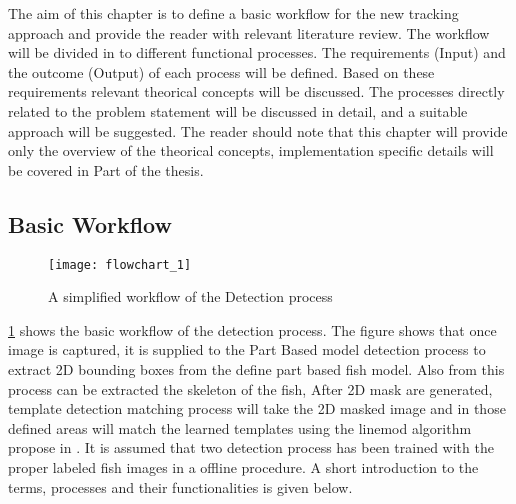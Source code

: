 The aim of this chapter is to define a basic workflow for the new tracking approach
and provide the reader with relevant literature review. The workflow will be divided
in to different functional processes. The requirements (Input) and the outcome (Output)
of each process will be defined. Based on these requirements relevant theorical concepts
will be discussed. The processes directly related to the problem statement will be 
discussed in detail, and a suitable approach will be suggested. The reader should
note that this chapter will provide only the overview of the theorical concepts, 
implementation specific details will be covered in Part  of the thesis.

\subsection{Basic Workflow}

\begin{figure}[ht]
\centering
\texttt{[image: flowchart\_1]}
\caption{A simplified workflow of the Detection process}
\label{fig:basicworkflow}
\end{figure}

\ref{fig:basicworkflow} shows the basic workflow of the detection process. The figure 
shows that once image is captured, it is supplied to the Part Based model detection 
process to extract 2D bounding boxes from the define part based fish model. Also from
this process can be extracted the skeleton of the fish, After 2D mask are generated, 
template detection matching process will take the 2D masked image and in those defined
areas will match the learned templates using the linemod algorithm propose in \citet{Hinterstoisser2012}. It is assumed that two detection process has been trained with the
proper labeled fish images in a offline procedure. A short introduction to the terms, processes and their functionalities is given below.

